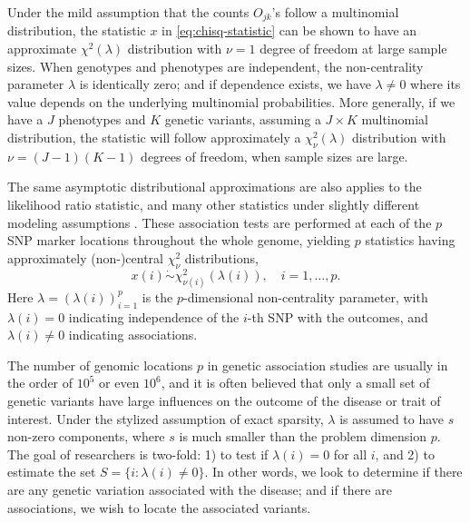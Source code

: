 Under the mild assumption that the counts $O_{jk}$'s follow a multinomial distribution, the statistic $x$ in \eqref{eq:chisq-statistic} can be shown to have an approximate $\chi^2(\lambda)$ distribution with $\nu=1$ degree of freedom at large sample sizes. 
When genotypes and phenotypes are independent, the non-centrality parameter $\lambda$ is identically zero; and if dependence exists, we have $\lambda\neq0$ where its value depends on the underlying multinomial probabilities.
More generally, if we have a $J$ phenotypes and $K$ genetic variants, assuming a $J\times K$ multinomial distribution, the statistic will follow approximately a $\chi^2_{\nu}(\lambda)$ distribution with $\nu = (J-1)(K-1)$ degrees of freedom, when sample sizes are large.

The same asymptotic distributional approximations are also applies to the likelihood ratio statistic, and many other statistics under slightly different modeling assumptions \cite{gao2019upass}.
These association tests are performed at each of the $p$ SNP marker locations throughout the whole genome, yielding $p$ statistics having approximately (non-)central $\chi^2_{\nu}$ distributions,
\begin{equation} \label{eq:model-chisquare-approx}
    x(i) \mathrel{\dot\sim} \chi_{\nu(i)}^2\left(\lambda(i)\right), \quad i=1,\ldots,p.
\end{equation}
Here $\lambda = (\lambda(i))_{i=1}^p$ is the $p$-dimensional non-centrality parameter, with $\lambda(i)=0$ indicating independence of the $i$-th SNP with the outcomes, and $\lambda(i)\neq0$ indicating associations.

The number of genomic locations $p$ in genetic association studies are usually in the order of $10^5$ or even $10^6$, and it is often believed that only a small set of genetic variants have large influences on the outcome of the disease or trait of interest.
Under the stylized assumption of exact sparsity, $\lambda$ is assumed to have $s$ non-zero components, where $s$ is much smaller than the problem dimension $p$. 
The goal of researchers is two-fold: 1) to test if $\lambda(i)=0$ for all $i$, and 2) to estimate the set $S=\{i:\lambda(i)\neq 0\}$.
In other words, we look to determine if there are any genetic variation associated with the disease; and if there are associations, we wish to locate the associated variants.

